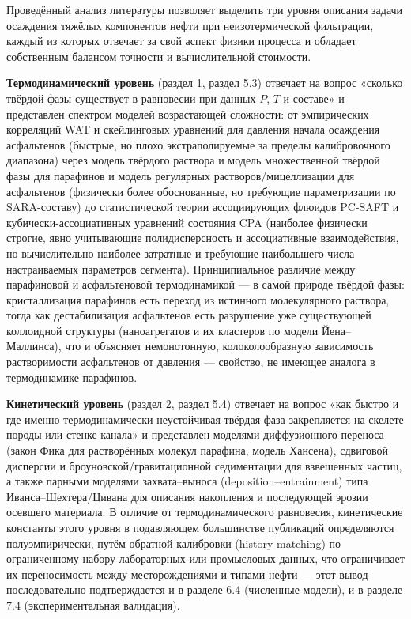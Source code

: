 \documentclass[11pt]{extarticle}
\begin{document}
Проведённый анализ литературы позволяет выделить три уровня описания задачи осаждения тяжёлых компонентов нефти при неизотермической фильтрации, каждый из которых отвечает за свой аспект физики процесса и обладает собственным балансом точности и вычислительной стоимости.

\textbf{Термодинамический уровень} (раздел 1, раздел 5.3) отвечает на вопрос «сколько твёрдой фазы существует в равновесии при данных \(P\), \(T\) и составе» и представлен спектром моделей возрастающей сложности: от эмпирических корреляций WAT и скейлинговых уравнений для давления начала осаждения асфальтенов (быстрые, но плохо экстраполируемые за пределы калибровочного диапазона) через модель твёрдого раствора и модель множественной твёрдой фазы для парафинов и модель регулярных растворов/мицеллизации для асфальтенов (физически более обоснованные, но требующие параметризации по SARA-составу) до статистической теории ассоциирующих флюидов PC-SAFT и кубически-ассоциативных уравнений состояния CPA (наиболее физически строгие, явно учитывающие полидисперсность и ассоциативные взаимодействия, но вычислительно наиболее затратные и требующие наибольшего числа настраиваемых параметров сегмента). Принципиальное различие между парафиновой и асфальтеновой термодинамикой --- в самой природе твёрдой фазы: кристаллизация парафинов есть переход из истинного молекулярного раствора, тогда как дестабилизация асфальтенов есть разрушение уже существующей коллоидной структуры (наноагрегатов и их кластеров по модели Йена--Маллинса), что и объясняет немонотонную, колоколообразную зависимость растворимости асфальтенов от давления --- свойство, не имеющее аналога в термодинамике парафинов.

\textbf{Кинетический уровень} (раздел 2, раздел 5.4) отвечает на вопрос «как быстро и где именно термодинамически неустойчивая твёрдая фаза закрепляется на скелете породы или стенке канала» и представлен моделями диффузионного переноса (закон Фика для растворённых молекул парафина, модель Хансена), сдвиговой дисперсии и броуновской/гравитационной седиментации для взвешенных частиц, а также парными моделями захвата--выноса (deposition--entrainment) типа Иванса--Шехтера/Цивана для описания накопления и последующей эрозии осевшего материала. В отличие от термодинамического равновесия, кинетические константы этого уровня в подавляющем большинстве публикаций определяются полуэмпирически, путём обратной калибровки (history matching) по ограниченному набору лабораторных или промысловых данных, что ограничивает их переносимость между месторождениями и типами нефти --- этот вывод последовательно подтверждается и в разделе 6.4 (численные модели), и в разделе 7.4 (экспериментальная валидация).
\end{document}
